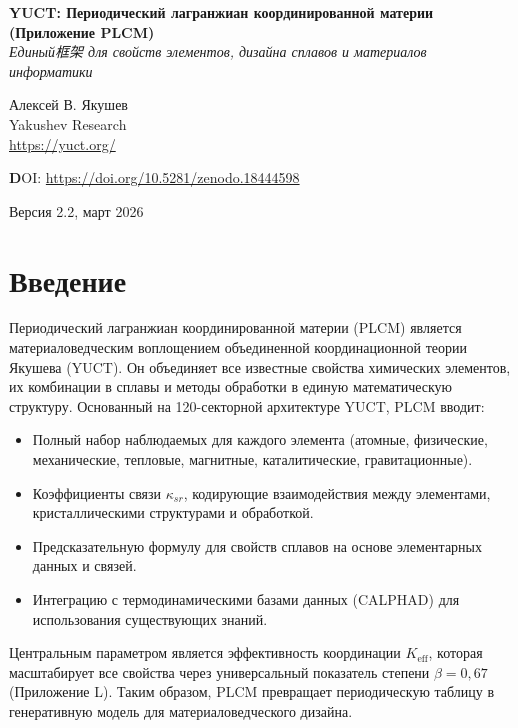 \documentclass[12pt,a4paper]{article}
\newcommand{\Keff}{K_{\mathrm{eff}}}
\newcommand{\be}{\beta}
\begin{document}
	
	\begin{titlepage}
		\centering
		\vspace*{1cm}
		\Huge\textbf{YUCT: Периодический лагранжиан координированной материи} \\
		\vspace{0.3cm}
		\Large\textbf{(Приложение PLCM)} \\
		\vspace{0.5cm}
		\large\textit{Единый框架 для свойств элементов, дизайна сплавов и материалов информатики}
		\vspace{2cm}
		
		\Large Алексей В. Якушев \\
		\large Yakushev Research \\
		\url{https://yuct.org/}
		\vspace{2cm}
		
		\vspace{2cm}
		\textbf DOI: \url{https://doi.org/10.5281/zenodo.18444598}\\
		
		\vspace{1cm}
		
		\large Версия 2.2, март 2026
		\vfill
	\end{titlepage}
	
	\tableofcontents
	\newpage
	
	\section{Введение}
	
	Периодический лагранжиан координированной материи (PLCM) является материаловедческим воплощением объединенной координационной теории Якушева (YUCT). Он объединяет все известные свойства химических элементов, их комбинации в сплавы и методы обработки в единую математическую структуру. Основанный на 120-секторной архитектуре YUCT, PLCM вводит:
	\begin{itemize}
		\item Полный набор наблюдаемых для каждого элемента (атомные, физические, механические, тепловые, магнитные, каталитические, гравитационные).
		\item Коэффициенты связи \(\kappa_{sr}\), кодирующие взаимодействия между элементами, кристаллическими структурами и обработкой.
		\item Предсказательную формулу для свойств сплавов на основе элементарных данных и связей.
		\item Интеграцию с термодинамическими базами данных (CALPHAD) для использования существующих знаний.
	\end{itemize}
	Центральным параметром является эффективность координации \(\Keff\), которая масштабирует все свойства через универсальный показатель степени \(\be = 0,67\) (Приложение L). Таким образом, PLCM превращает периодическую таблицу в генеративную модель для материаловедческого дизайна.
	
\end{document}
